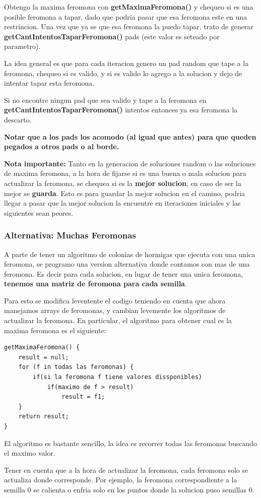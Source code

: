 Obtengo la maxima feromona con \textbf{getMaximaFeromona()} y chequeo si es una posible feromona a tapar, dado que podria pasar que esa feromona este en una restrincion. 
Una vez que ya se que esa feromona la puedo tapar, trato de generar \textbf{getCantIntentosTaparFeromona()} pads (este valor es seteado por parametro). 

La idea general es que para cada iteracion genero un pad random que tape a la feromona, chequeo si es valido, y si es valido lo agrego a la solucion y dejo de intentar tapar esta feromona.

Si no encontre ningun pad que sea valido y tape a la feromona en \textbf{getCantIntentosTaparFeromona()} intentos entonces ya esa feromona la descarto. 

\textbf{Notar que a los pads los acomodo (al igual que antes) para que queden pegados a otros pads o al borde.}

\textbf{Nota importante:} Tanto en la generacion de soluciones random o las soluciones de maxima feromona, a la hora de fijarse si es una buena o mala solucion para actualizar la feromona, se chequea si es la \textbf{mejor solucion}, en caso de ser la mejor se \textbf{guarda}. Esto es para guardar la mejor solucion en el camino, podria llegar a pasar que la mejor solucion la encuentre en iteraciones iniciales y las siguientes sean peores.


\subsubsection{Alternativa: Muchas Feromonas}
A parte de tener un algoritmo de colonias de hormigas que ejecuta con una unica feromona, se programo una version alternativa donde contamos con mas de una feromona. Es decir para cada solucion, en lugar de tener una unica feromona, \textbf{tenemos una matriz de feromona para cada semilla}.
 
Para esto se modifica leventente el codigo teniendo en cuenta que ahora manejamos arrays de feromonas, y cambian levemente los algoritmos de actualizar la feromona. En particular, el algoritmo para obtener cual es la maxima feromona es el siguiente:


\begin{verbatim}
getMaximaFeromona() {
    result = null;
    for (f in todas las feromonas) {
        if(si la feromona f tiene valores dissponibles)
            if(maximo de f > result)
                result = f1;
    }
    return result;
}
\end{verbatim}

El algoritmo es bastante sencillo, la idea es recorrer todas las feromonas buscando el maximo valor. 

Tener en cuenta que a la hora de actualizar la feromona, cada feromona solo se actualiza donde corresponde. Por ejemplo,  la feromona correspondiente a la semilla 0 se calienta o enfria solo en los puntos donde la solucion puso semillas 0. 